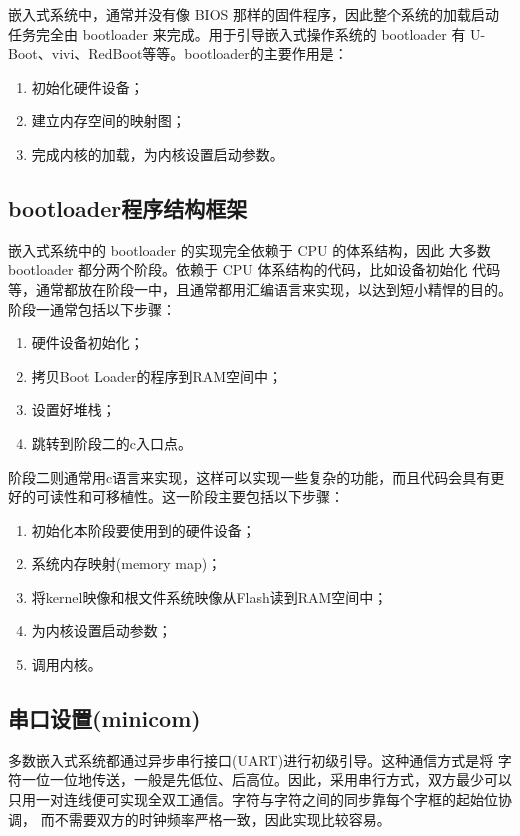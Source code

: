 	嵌入式系统中，通常并没有像 BIOS 那样的固件程序，因此整个系统的加载启动
任务完全由 bootloader 来完成。用于引导嵌入式操作系统的 bootloader 有
U-Boot、vivi、RedBoot等等。bootloader的主要作用是：
\begin{enumerate}
  \item 初始化硬件设备；
  \item 建立内存空间的映射图；
  \item 完成内核的加载，为内核设置启动参数。
\end{enumerate}

\subsection{bootloader程序结构框架}
	嵌入式系统中的 bootloader 的实现完全依赖于 CPU 的体系结构，因此
大多数 bootloader 都分两个阶段。依赖于 CPU 体系结构的代码，比如设备初始化
代码等，通常都放在阶段一中，且通常都用汇编语言来实现，以达到短小精悍的目的。
阶段一通常包括以下步骤：
\begin{enumerate}
  \item 硬件设备初始化；
  \item 拷贝Boot Loader的程序到RAM空间中；
  \item 设置好堆栈；
  \item 跳转到阶段二的c入口点。
\end{enumerate}

	阶段二则通常用c语言来实现，这样可以实现一些复杂的功能，而且代码会具有更好的可读性和可移植性。这一阶段主要包括以下步骤：
\begin{enumerate}
  \item 初始化本阶段要使用到的硬件设备；
  \item 系统内存映射(memory map)；
  \item 将kernel映像和根文件系统映像从Flash读到RAM空间中； 
  \item 为内核设置启动参数；
  \item 调用内核。
\end{enumerate}

\subsection{串口设置(minicom)}
    多数嵌入式系统都通过异步串行接口(UART)进行初级引导。这种通信方式是将
字符一位一位地传送，一般是先低位、后高位。因此，采用串行方式，双方最少可以
只用一对连线便可实现全双工通信。字符与字符之间的同步靠每个字框的起始位协调，
而不需要双方的时钟频率严格一致，因此实现比较容易。

